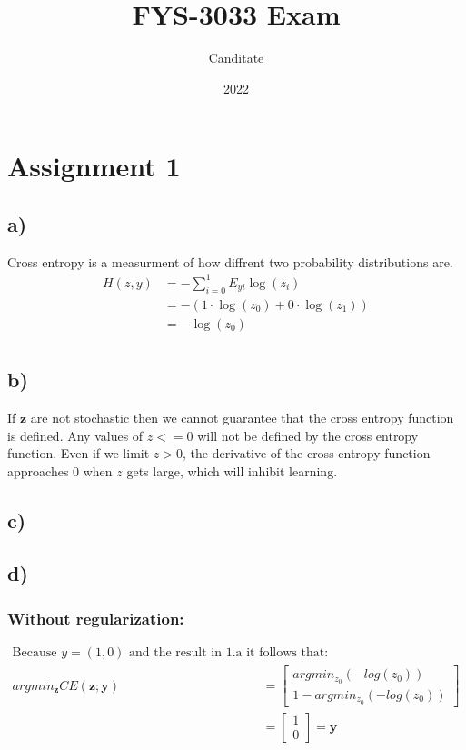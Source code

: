 \documentclass{article}
\title{FYS-3033 Exam}
\author{Canditate}
\date{2022}
\begin{document}
\maketitle
\section{Assignment 1}
\subsection*{a)}
Cross entropy is a measurment of how diffrent two probability distributions are.
\begin{equation}
    \begin{split}
        H(z,y) &= -\sum_{i=0}^1 E_{yi}\log(z_i)\\
        &= -\left(1\cdot\log(z_0)+0\cdot\log(z_1)\right)\\
        &= -\log(z_0)\\    
    \end{split}
\end{equation}

\subsection*{b)}
If $\mathbf{z}$ are not stochastic then we cannot guarantee that the cross entropy function is defined. Any values of $z <= 0$ will not be defined by the cross entropy function. Even if we limit $z > 0$, the derivative of the cross entropy function approaches $0$ when $z$ gets large, which will inhibit learning.

\subsection*{c)}
\subsection*{d)}

\subsubsection*{Without regularization:}
\begin{equation}
    \begin{split} 
        \text{Because $y=(1,0)$ and the result in 1.a it follows that:}\\
        argmin_\mathbf{z} CE(\mathbf{z}; \mathbf{y})&=\begin{bmatrix}argmin_{z_0}(-log(z_0))\\1-argmin_{z_0}(-log(z_0))\end{bmatrix}\\
        &=\begin{bmatrix}1\\0\end{bmatrix} = \mathbf{y}
    \end{split}
\end{equation}
\end{document}
